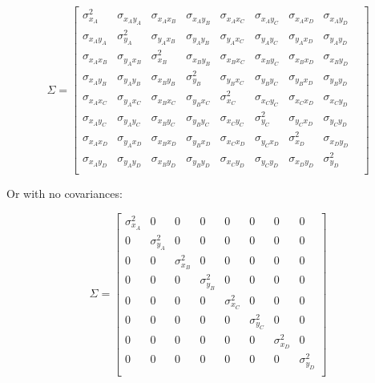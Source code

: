 \[
\Sigma = 
\begin{bmatrix}
\sigma_{x_A}^2 & \sigma_{x_Ay_A} & \sigma_{x_Ax_B} & \sigma_{x_Ay_B} & \sigma_{x_Ax_C} & \sigma_{x_Ay_C} & \sigma_{x_Ax_D} & \sigma_{x_Ay_D} &  \\ 
\sigma_{x_Ay_A} & \sigma_{y_A}^2 & \sigma_{y_Ax_B} & \sigma_{y_Ay_B} & \sigma_{y_Ax_C} & \sigma_{y_Ay_C} & \sigma_{y_Ax_D} & \sigma_{y_Ay_D} &  \\ 
\sigma_{x_Ax_B} & \sigma_{y_Ax_B} & \sigma_{x_B}^2 & \sigma_{x_By_B} & \sigma_{x_Bx_C} & \sigma_{x_By_C} & \sigma_{x_Bx_D} & \sigma_{x_By_D} &  \\ 
\sigma_{x_Ay_B} & \sigma_{y_Ay_B} & \sigma_{x_By_B} & \sigma_{y_B}^2 & \sigma_{y_Bx_C} & \sigma_{y_By_C} & \sigma_{y_Bx_D} & \sigma_{y_By_D} &  \\ 
\sigma_{x_Ax_C} & \sigma_{y_Ax_C} & \sigma_{x_Bx_C} & \sigma_{y_Bx_C} & \sigma_{x_C}^2 & \sigma_{x_Cy_C} & \sigma_{x_Cx_D} & \sigma_{x_Cy_D} &  \\ 
\sigma_{x_Ay_C} & \sigma_{y_Ay_C} & \sigma_{x_By_C} & \sigma_{y_By_C} & \sigma_{x_Cy_C} & \sigma_{y_C}^2 & \sigma_{y_Cx_D} & \sigma_{y_Cy_D} &  \\ 
\sigma_{x_Ax_D} & \sigma_{y_Ax_D} & \sigma_{x_Bx_D} & \sigma_{y_Bx_D} & \sigma_{x_Cx_D} & \sigma_{y_Cx_D} & \sigma_{x_D}^2 & \sigma_{x_Dy_D} &  \\ 
\sigma_{x_Ay_D} & \sigma_{y_Ay_D} & \sigma_{x_By_D} & \sigma_{y_By_D} & \sigma_{x_Cy_D} & \sigma_{y_Cy_D} & \sigma_{x_Dy_D} & \sigma_{y_D}^2 &  \\ 
\end{bmatrix}
\]

Or with no covariances:

\[
\Sigma = 
\begin{bmatrix}
\sigma_{x_A}^2 &  0 &  0 &  0 &  0 &  0 &  0 &  0  \\ 
0 & \sigma_{y_A}^2 &  0 &  0 &  0 &  0 &  0 &  0   \\ 
0 &  0 & \sigma_{x_B}^2 &  0 &  0 &  0 &  0 &  0   \\ 
0 &  0 &  0 & \sigma_{y_B}^2 &  0 &  0 &  0 &  0   \\ 
0 &  0 &  0 &  0 & \sigma_{x_C}^2 &  0 &  0 &  0   \\ 
0 &  0 &  0 &  0 &  0 & \sigma_{y_C}^2 &  0 &  0   \\ 
0 &  0 &  0 &  0 &  0 &  0 & \sigma_{x_D}^2 &  0   \\ 
0 &  0 &  0 &  0 &  0 &  0 &  0 & \sigma_{y_D}^2   \\ 
\end{bmatrix}
\]

